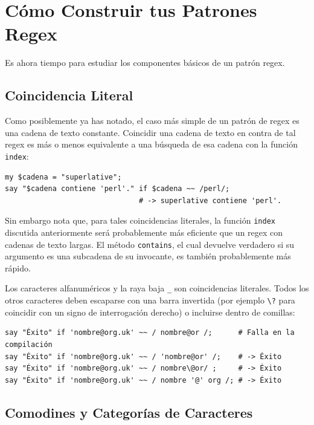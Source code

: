 \section{Cómo Construir tus Patrones Regex}
\label{pattern}

Es ahora tiempo para estudiar los componentes básicos de 
un patrón regex.

\subsection{Coincidencia Literal}

Como posiblemente ya has notado, el caso más simple de un
patrón de regex es una cadena de texto constante. Coincidir
una cadena de texto en contra de tal regex es más o menos 
equivalente a una búsqueda de esa cadena con la función 
{\tt index}:

\begin{verbatim}
my $cadena = "superlative";
say "$cadena contiene 'perl'." if $cadena ~~ /perl/;
                               # -> superlative contiene 'perl'.
\end{verbatim}
%

Sin embargo nota que, para tales coincidencias literales, 
la función {\tt index} discutida anteriormente será probablemente
más eficiente que un regex con cadenas de texto largas. 
El método {\tt contains}, el cual devuelve verdadero si su
argumento es una subcadena de su invocante, es también probablemente
más rápido.

Los caracteres alfanuméricos y la raya baja \verb|_| son coincidencias
literales. Todos los otros caracteres deben escaparse con una barra
invertida (por ejemplo \verb|\?| para coincidir con un signo de interrogación
derecho) o incluirse dentro de comillas:

\begin{verbatim}
say "Éxito" if 'nombre@org.uk' ~~ / nombre@or /;      # Falla en la compilación
say "Éxito" if 'nombre@org.uk' ~~ / 'nombre@or' /;    # -> Éxito
say "Éxito" if 'nombre@org.uk' ~~ / nombre\@or/ ;     # -> Éxito
say "Éxito" if 'nombre@org.uk' ~~ / nombre '@' org /; # -> Éxito
\end{verbatim}
%


\subsection{Comodines y Categorías de Caracteres}

